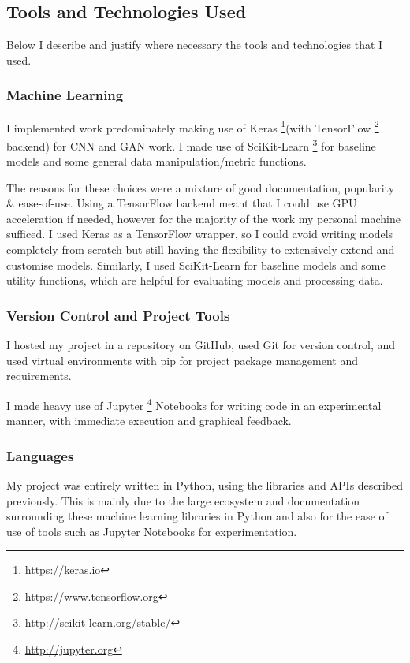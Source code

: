 \documentclass[12pt,a4paper,twoside]{report}
\let\oldfootnote\footnote
\renewcommand\footnote[1]{%
\oldfootnote{\hspace{2mm}#1}}
\begin{document}
\subsection{Tools and Technologies Used} \label{tools}

Below I describe and justify where necessary the tools and technologies that I used.

\subsubsection{Machine Learning}

I implemented work predominately making use of Keras\footnote{\href{https://keras.io}{https://keras.io}}(with TensorFlow\footnote{\href{https://www.tensorflow.org}{https://www.tensorflow.org}} backend) for CNN and GAN work. I made use of SciKit-Learn\footnote{\href{http://scikit-learn.org/stable/}{http://scikit-learn.org/stable/}} for baseline models and some general data manipulation/metric functions. 

The reasons for these choices were a mixture of good documentation, popularity \& ease-of-use. Using a TensorFlow backend meant that I could use GPU acceleration if needed, however for the majority of the work my personal machine sufficed. I used Keras as a TensorFlow wrapper, so I could avoid writing models completely from scratch but still having the flexibility to extensively extend and customise models. Similarly, I used SciKit-Learn for baseline models and some utility functions, which are helpful for evaluating models and processing data.

\subsubsection{Version Control and Project Tools}

I hosted my project in a repository on GitHub, used Git for version control, and used virtual environments with pip for project package management and requirements.

I made heavy use of Jupyter\footnote{\href{http://jupyter.org}{http://jupyter.org}} Notebooks for writing code in an experimental manner, with immediate execution and graphical feedback. 


\subsubsection{Languages}

My project was entirely written in Python, using the libraries and APIs described previously. This is mainly due to the large ecosystem and documentation surrounding these machine learning libraries in Python and also for the ease of use of tools such as Jupyter Notebooks for experimentation.
\end{document}
